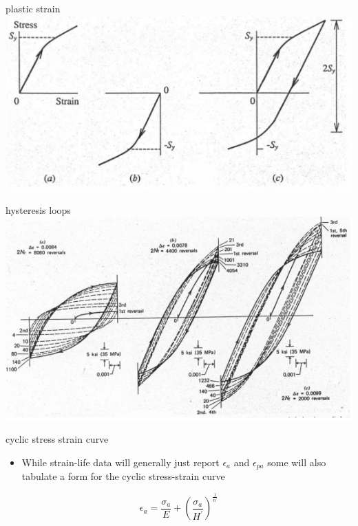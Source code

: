 \documentclass[
  letterpaper,
  ignorenonframetext,
  aspectratio=43,
  handout,
  12pt]{beamer}
\providecommand{\tightlist}{%
  \setlength{\itemsep}{0pt}\setlength{\parskip}{0pt}}
\providecommand{\tightlist}{%
\setlength{\itemsep}{0pt}\setlength{\parskip}{0pt}}
\let\Oldincludegraphics\includegraphics
\renewcommand{\includegraphics}[2][]{\Oldincludegraphics[width=\textwidth,height=0.7\textheight,keepaspectratio]{#2}}
\begin{document}
\begin{frame}{plastic strain}
\protect\hypertarget{plastic-strain}{}
\includegraphics{../images/plastic_strain.PNG}
\end{frame}

\begin{frame}{hysteresis loops}
\protect\hypertarget{hysteresis-loops}{}
\includegraphics{../images/hysteresis_loops.PNG}
\end{frame}

\begin{frame}{cyclic stress strain curve}
\protect\hypertarget{cyclic-stress-strain-curve}{}
\begin{itemize}
\tightlist
\item
  While strain-life data will generally just report \(\epsilon_a\) and
  \(\epsilon_{pa}\) some will also tabulate a form for the cyclic
  stress-strain curve
\end{itemize}

\[\epsilon_a = \frac{\sigma_a}{E} + \left(\frac{\sigma_a}{H^\prime}\right)^{\frac{1}{n^\prime}}\]
\end{frame}
\end{document}
